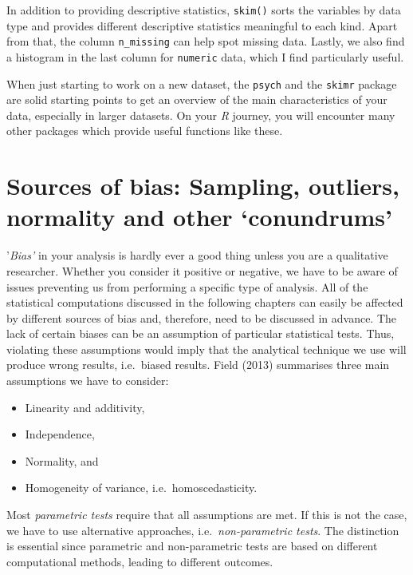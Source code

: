 \documentclass[
  letterpaper,
]{krantz}
\begin{document}
In addition to providing descriptive statistics, \texttt{skim()} sorts
the variables by data type and provides different descriptive statistics
meaningful to each kind. Apart from that, the column \texttt{n\_missing}
can help spot missing data. Lastly, we also find a histogram in the last
column for \texttt{numeric} data, which I find particularly useful.

When just starting to work on a new dataset, the \texttt{psych} and the
\texttt{skimr} package are solid starting points to get an overview of
the main characteristics of your data, especially in larger datasets. On
your \emph{R} journey, you will encounter many other packages which
provide useful functions like these.


\chapter{Sources of bias: Sampling, outliers, normality and other
`conundrums'}\label{sec-sources-of-bias}

'\emph{Bias'} in your analysis is hardly ever a good thing unless you
are a qualitative researcher. Whether you consider it positive or
negative, we have to be aware of issues preventing us from performing a
specific type of analysis. All of the statistical computations discussed
in the following chapters can easily be affected by different sources of
bias and, therefore, need to be discussed in advance. The lack of
certain biases can be an assumption of particular statistical tests.
Thus, violating these assumptions would imply that the analytical
technique we use will produce wrong results, i.e.~biased results. Field
(2013) summarises three main assumptions we have to consider:

\begin{itemize}
\item
  Linearity and additivity,
\item
  Independence,
\item
  Normality, and
\item
  Homogeneity of variance, i.e.~homoscedasticity.
\end{itemize}

Most \emph{parametric tests} require that all assumptions are met. If
this is not the case, we have to use alternative approaches,
i.e.~\emph{non-parametric tests}. The distinction is essential since
parametric and non-parametric tests are based on different computational
methods, leading to different outcomes.
\end{document}

